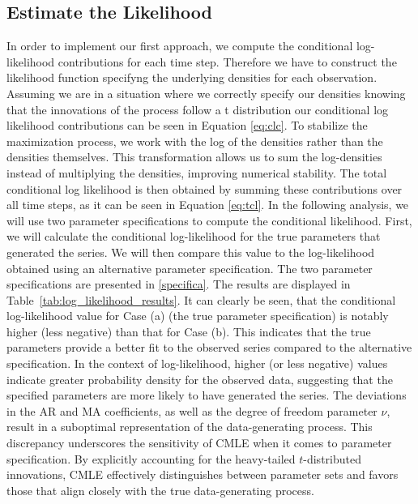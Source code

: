 \documentclass[12pt]{article}
\begin{document}
 \subsection{Estimate the Likelihood}
In order to implement our first approach, we compute the conditional log-likelihood contributions for each time step. Therefore we have to construct the likelihood function specifyng the underlying densities for each observation. 
Assuming we are in a situation where we correctly specify our densities knowing that the innovations of the process follow a t distribution our conditional log likelihood contributions can be seen in Equation \eqref{eq:clc}.
To stabilize the maximization process, we work with the log of the densities rather than the densities themselves. This transformation allows us to sum the log-densities instead of multiplying the densities, improving numerical stability.
The total conditional log likelihood is then obtained by summing these contributions over all time steps, as it can be seen in Equation \eqref{eq:tcl}.
In the following analysis, we will use two parameter specifications to compute the conditional likelihood. First, we will calculate the conditional log-likelihood for the true parameters that generated the series. We will then compare this value to the log-likelihood obtained using an alternative parameter specification. The two parameter specifications are presented in \ref{specifica}. The results are displayed in Table~\ref{tab:log_likelihood_results}.
It can clearly be seen, that the conditional log-likelihood value for Case (a) (the true parameter specification) is notably higher (less negative) than that for Case (b). This indicates that the true parameters provide a better fit to the observed series compared to the alternative specification.
In the context of log-likelihood, higher (or less negative) values indicate greater probability density for the observed data, suggesting that the specified parameters are more likely to have generated the series.
The deviations in the AR and MA coefficients, as well as the degree of freedom parameter $\nu$, result in a suboptimal representation of the data-generating process. 
This discrepancy underscores the sensitivity of CMLE when it comes to parameter specification.
By explicitly accounting for the heavy-tailed $t$-distributed innovations, CMLE effectively distinguishes between parameter sets and favors those that align closely with the true data-generating process.
\end{document}
